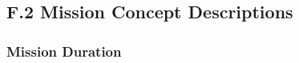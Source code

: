 \documentclass[12pt,journal]{IEEEtran}
\begin{document}
\subsection{F.2 Mission Concept Descriptions }\label{sec:f2_concept}
 

\subsubsection{Mission Duration}
\end{document}
